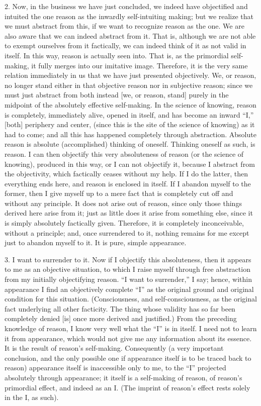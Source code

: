 2. Now, in the business we have just concluded,
we indeed have objectified and intuited the one reason
as the inwardly self-intuiting making;
but we realize that we must abstract from this,
if we want to recognize reason as the one.
We are also aware that we can indeed abstract from it.
That is, although we are not able
to exempt ourselves from it factically,
we can indeed think of it as not valid in itself.
In this way, reason is actually seen into.
That is, as the primordial self-making,
it fully merges into our imitative image.
Therefore, it is the very same relation
immediately in us that we have just presented objectively.
We, or reason, no longer stand
either in that objective reason
nor in subjective reason;
since we must just abstract from both
instead [we, or reason, stand] purely in
the midpoint of the absolutely effective self-making.
In the science of knowing,
reason is completely, immediately alive,
opened in itself,
and has become an inward “I,”
[both] periphery and center,
(since this is the site of the science of knowing)
as it had to come;
and all this has happened
completely through abstraction.
Absolute reason is absolute
(accomplished) thinking of oneself.
Thinking oneself as such, is reason.
I can then objectify this
very absoluteness of reason
(or the science of knowing),
produced in this way,
or I can not objectify it,
because I abstract from the objectivity,
which factically ceases without my help.
If I do the latter,
then everything ends here,
and reason is enclosed in itself.
If I abandon myself to the former,
then I give myself up to a mere fact
that is completely cut off
and without any principle.
It does not arise out of reason,
since only those things derived here arise from it;
just as little does it arise from something else,
since it is simply absolutely factically given.
Therefore, it is completely inconceivable,
without a principle;
and, once surrendered to it,
nothing remains for me
except just to abandon myself to it.
It is pure, simple appearance.

3. I want to surrender to it.
Now if I objectify this absoluteness,
then it appears to me as an objective situation,
to which I raise myself through free abstraction
from my initially objectifying reason.
“I want to surrender,”  I say;
hence, within appearance I find
an objectively complete “I”
as the original ground and original condition
for this situation.
(Consciousness, and self-consciousness,
as the original fact underlying all other facticity.
The thing whose validity has so far been completely denied [is]
once more derived and justified.)
From the preceding knowledge of reason,
I know very well what the “I” is in itself.
I need not to learn it from appearance,
which would not give me any information about its essence.
It is the result of reason's self-making.
Consequently
(a very important conclusion,
and the only possible one if appearance itself is
to be traced back to reason)
appearance itself is inaccessible only to me,
to the “I” projected absolutely through appearance;
it itself is a self-making of reason,
of reason's primordial effect,
and indeed as an I.
(The imprint of reason's effect
rests solely in the I, as such).

